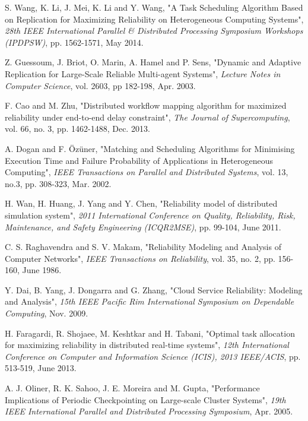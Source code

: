 \documentclass{cslthse-msc}
\begin{document}
\begin{thebibliography}{50}
	S. Wang, K. Li, J. Mei, K. Li and Y. Wang,
	"A Task Scheduling Algorithm Based on Replication for Maximizing Reliability on Heterogeneous Computing Systems",
	\emph{28th IEEE International Parallel \& Distributed Processing Symposium Workshops (IPDPSW)}, pp. 1562-1571, May 2014.

	Z. Guessoum, J. Briot, O. Marin, A. Hamel and P. Sens,
	"Dynamic and Adaptive Replication for Large-Scale Reliable Multi-agent Systems",
	\emph{Lecture Notes in Computer Science}, vol. 2603, pp 182-198, Apr. 2003.

	F. Cao and M. Zhu,
	"Distributed workflow mapping algorithm for maximized reliability under end-to-end delay constraint",
	\emph{The Journal of Supercomputing}, vol. 66, no. 3, pp. 1462-1488, Dec. 2013.

	A. Dogan and F. Özüner,
	"Matching and Scheduling Algorithms for Minimising Execution Time and Failure Probability of Applications in Heterogeneous Computing",
	\emph{IEEE Transactions on Parallel and Distributed Systems}, vol. 13, no.3, pp. 308-323, Mar. 2002.

	H. Wan, H. Huang, J. Yang and Y. Chen,
	"Reliability model of distributed simulation system",
	\emph{2011 International Conference on Quality, Reliability, Risk, Maintenance, and Safety Engineering (ICQR2MSE)}, pp. 99-104,	June 2011.

	C. S. Raghavendra and S. V. Makam,
	"Reliability Modeling and Analysis of Computer Networks",
	\emph{IEEE Transactions on Reliability}, vol. 35, no. 2, pp. 156-160, June 1986.

	Y. Dai, B. Yang, J. Dongarra and G. Zhang,
	"Cloud Service Reliability: Modeling and Analysis",
	\emph{15th IEEE Pacific Rim International Symposium on Dependable Computing}, Nov. 2009. %

	H. Faragardi, R. Shojaee, M. Keshtkar and H. Tabani,
	"Optimal task allocation for maximizing reliability in distributed real-time systems",
	\emph{12th International Conference on Computer and Information Science (ICIS), 2013 IEEE/ACIS}, pp. 513-519, June 2013.

	A. J. Oliner, R. K. Sahoo, J. E. Moreira and M. Gupta,
	"Performance Implications of Periodic Checkpointing on Large-scale Cluster Systems",
	\emph{19th IEEE International Parallel and Distributed Processing Symposium}, Apr. 2005. %


\end{thebibliography}
\end{document}
